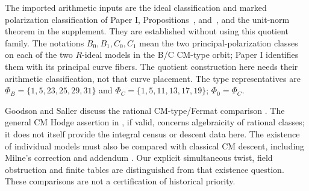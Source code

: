 The imported arithmetic inputs are the ideal classification and marked
polarization classification of Paper I, Propositions~,
 and~,
and the unit-norm theorem in the supplement. They are established without
using this quotient family. The notations $B_0,B_1,C_0,C_1$ mean the two
principal-polarization classes on each of the two $R$-ideal models in the
B/C CM-type orbit; Paper I identifies them with its principal curve fibers.
The quotient construction here needs their arithmetic classification, not
that curve placement. The type representatives are
$\Phi_B=\{1,5,23,25,29,31\}$ and
$\Phi_C=\{1,5,11,13,17,19\}$; $\Phi_0=\Phi_C$.

Goodson and Saller discuss the rational CM-type/Fermat comparison
\cite{Goodson2024,Saller2026}. The general CM Hodge assertion in
\cite{OpenAICM2026}, if valid, concerns algebraicity of rational classes;
it does not itself provide the integral census or descent data here.
The existence of individual models must also be compared with classical
CM descent, including Milne's correction and addendum
\cite{MilneModuli1972,MilneModuli1974}. Our explicit simultaneous twist,
field obstruction and finite tables are distinguished from that existence
question. These comparisons are not a certification of historical priority.
